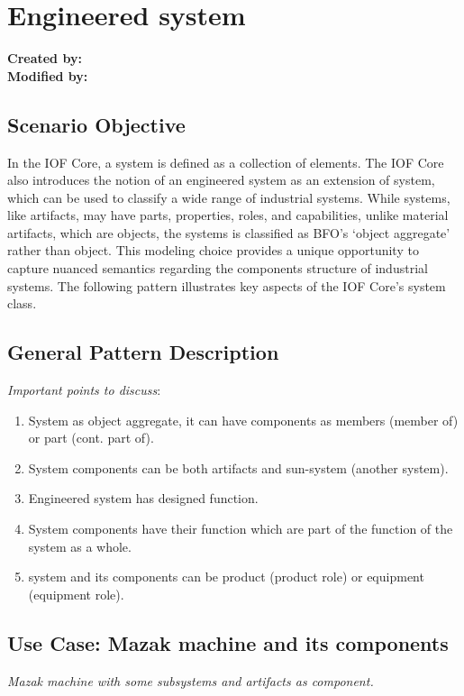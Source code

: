 
\section{Engineered system}
\label{chapter-scenario-template}

\textbf{Created by:}  \\
\textbf{Modified by:}  \\

\subsection*{Scenario Objective}
In the IOF Core, a system is defined as a collection of elements. The IOF Core also introduces the notion of an engineered system as an extension of system, which can be used to classify a wide range of industrial systems. While systems, like artifacts, may have parts, properties, roles, and capabilities, unlike material artifacts, which are objects, the systems is classified as BFO’s `object aggregate' rather than object. This modeling choice provides a unique opportunity to capture nuanced semantics regarding the components structure of industrial systems. The following pattern illustrates key aspects of the IOF Core’s system class.

\subsection*{General Pattern Description}

\textit{Important points to discuss}:

\begin{enumerate}
    \item System as object aggregate, it can have components as members (member of) or part (cont. part of).
    \item System components can be both artifacts and sun-system (another system).
    \item Engineered system has designed function. 
    \item System components have their function which are part of the function of the system as a whole.
    \item system and its components can be product (product role) or equipment (equipment role).
\end{enumerate}


\subsection*{Use Case: Mazak machine and its components}
 \textit{Mazak machine with some subsystems and artifacts as component.}

